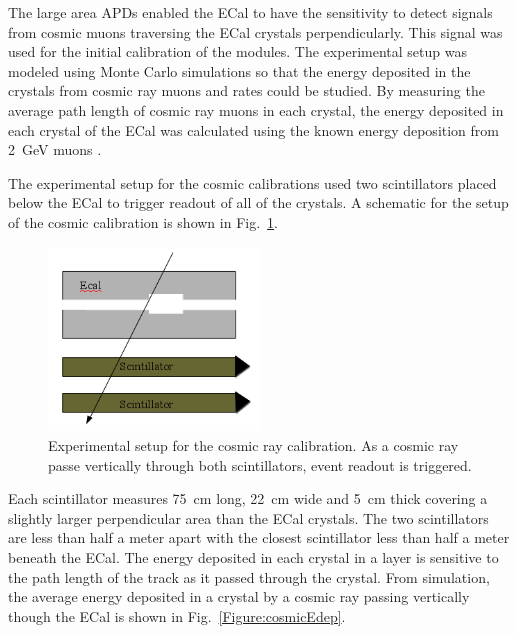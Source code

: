 The large area APDs enabled the ECal to have the sensitivity to detect signals from cosmic muons traversing the ECal crystals perpendicularly. This signal was used for the initial calibration of the modules. The experimental setup was modeled using Monte Carlo simulations so that the energy deposited in the crystals from cosmic ray muons and rates could be studied. By measuring the average path length of cosmic ray muons in each crystal, the energy deposited in each crystal of the ECal was calculated using the known energy deposition from 2~GeV muons \cite{Olive}. 

The experimental setup for the cosmic calibrations used two scintillators placed below the ECal to trigger readout of all of the crystals. A schematic for the setup of the cosmic calibration is shown in Fig.~\ref{Figure:cosmicScheme}.


\begin{figure}[H]
  \centering
      \includegraphics[width=0.5\textwidth]{pics/performance/cosmicschematic.png}
  \caption[Setup for ECal cosmic ray calibration]{Experimental setup for the cosmic ray calibration. As a cosmic ray passe vertically through both scintillators, event readout is triggered.}
  \label{Figure:cosmicScheme}
\end{figure}

Each scintillator measures 75~cm long, 22~cm wide and 5~cm thick covering a slightly larger perpendicular area than the ECal crystals. The two scintillators are less than half a meter apart with the closest scintillator less than half a meter beneath the ECal. The energy deposited in each crystal in a layer is sensitive to the path length of the track as it passed through the crystal. From simulation, the average energy deposited in a crystal by a cosmic ray passing vertically though the ECal is shown in Fig.~\ref{Figure:cosmicEdep}.

